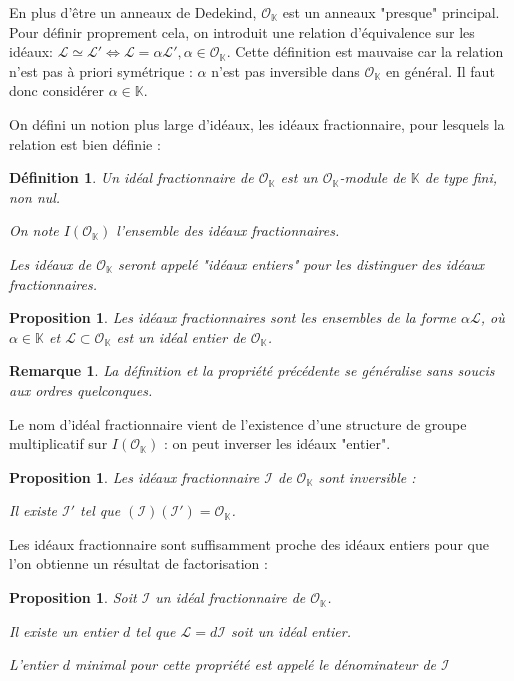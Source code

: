 \documentclass{article}
\newcommand{\K}[0]{\mathbb{K}}
\newcommand{\OR}[0]{\mathcal{O}}
\newcommand{\LR}[0]{\mathcal{L}}
\newcommand{\IR}[0]{\mathcal{I}}
\newtheorem{Prop}[The]{Proposition}
\newtheorem{Def}[The]{Définition}
\newtheorem{Rem}[The]{Remarque}
\begin{document}
En plus d'être un anneaux de Dedekind, $\OR_{\K}$ est un anneaux "presque" principal. Pour définir proprement cela, on introduit une relation d'équivalence sur les idéaux: $\LR\simeq\LR'\iff\LR = \alpha\LR',\alpha\in\OR_{\K}$. Cette définition est mauvaise car la relation n'est pas à priori symétrique : $\alpha$ n'est pas inversible dans $\OR_{\K}$ en général. Il faut donc considérer $\alpha\in\K$.

On défini un notion plus large d'idéaux, les idéaux fractionnaire, pour lesquels la relation est bien définie :

\begin{Def}
	Un idéal fractionnaire de $\OR_{\K}$ est un $\OR_{\K}$-module de $\K$ de type fini, non nul. 
	
	On note $I(\OR_{\K})$ l'ensemble des idéaux fractionnaires. 
	
	Les idéaux de $\OR_{\K}$ seront appelé "idéaux entiers" pour les distinguer des idéaux fractionnaires. 
\end{Def}

\begin{Prop}
	Les idéaux fractionnaires sont les ensembles de la forme $\alpha\LR$, où $\alpha\in\K$ et $\LR\subset\OR_{\K}$ est un idéal entier de $\OR_{\K}$.
\end{Prop}

\begin{Rem}
	La définition et la propriété précédente se généralise sans soucis aux ordres quelconques. 
\end{Rem}


Le nom d'idéal fractionnaire vient de l'existence d'une structure de groupe multiplicatif sur $I(\OR_{\K})$ : on peut inverser les idéaux "entier". 

\begin{Prop}
	Les idéaux fractionnaire $\IR$ de $\OR_{\K}$ sont inversible :
	
	Il existe $\IR'$ tel que $(\IR)(\IR') = \OR_{\K}$.
\end{Prop}

Les idéaux fractionnaire sont suffisamment proche des idéaux entiers pour que l'on obtienne un résultat de factorisation :

\begin{Prop}
	Soit $\IR$ un idéal fractionnaire de $\OR_{\K}$.
	
	 Il existe un entier $d$ tel que $\LR = d\IR$ soit un idéal entier.
	 
	 L'entier $d$ minimal pour cette propriété est appelé le dénominateur de $\IR$
\end{Prop}
\end{document}
